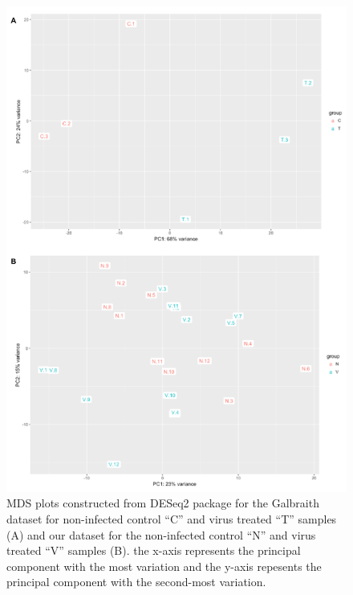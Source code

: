 \documentclass[11pt,a4paper,oldfontcommands,openany]{memoir}
\numberwithin{equation}{section} %
\begin{document}
\begin{figure}[H]
\begin{framed}
  \includegraphics[width=\textwidth]{Images/mdsPlots}
\end{framed}
  \caption{MDS plots constructed from DESeq2 package for the Galbraith dataset for non-infected control ``C'' and virus treated ``T'' samples (A) and our dataset for the non-infected control ``N'' and virus treated ``V'' samples (B). the x-axis represents the principal component with the most variation and the y-axis repesents the principal component with the second-most variation.}
  \label{fig:mdsPlots}
\end{figure}
\end{document}
